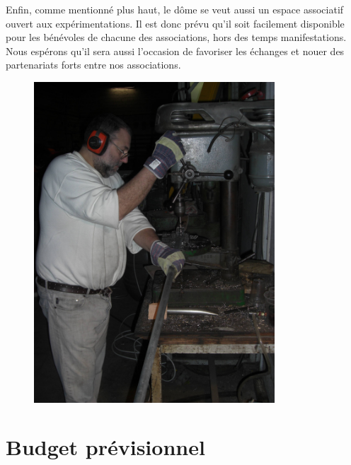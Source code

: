 \documentclass[a4paper,12pt]{report}
\begin{document}
Enfin, comme mentionné plus haut, le dôme se veut aussi un espace associatif
ouvert aux expérimentations. Il est donc prévu qu'il soit facilement disponible
pour les bénévoles de chacune des associations, hors des temps manifestations.
Nous espérons qu'il sera aussi l'occasion de favoriser les échanges et nouer
des partenariats forts entre nos associations.

\begin{figure}[!h]
\centering
\includegraphics[width=9cm]{percage.jpg}
\end{figure}


\chapter{Budget prévisionnel}
\end{document}
